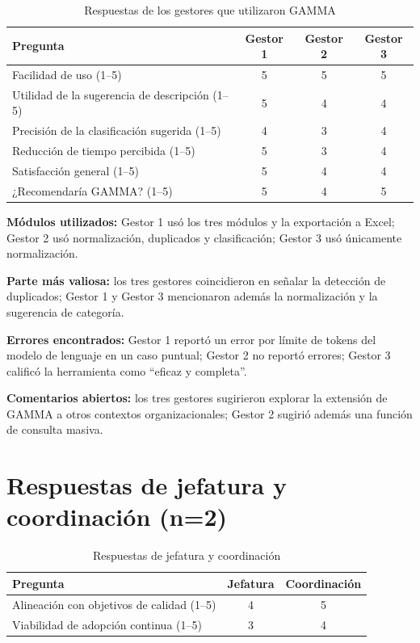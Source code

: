 \begin{table}[!htb]
\centering
\small
\caption{Respuestas de los gestores que utilizaron GAMMA}
\label{tab:encuesta-gestores}
\begin{tabular}{p{5.5cm}ccc}
\toprule
\textbf{Pregunta} & \textbf{Gestor 1} & \textbf{Gestor 2} & \textbf{Gestor 3} \\
\midrule
Facilidad de uso (1--5) & 5 & 5 & 5 \\
Utilidad de la sugerencia de descripción (1--5) & 5 & 4 & 4 \\
Precisión de la clasificación sugerida (1--5) & 4 & 3 & 4 \\
Reducción de tiempo percibida (1--5) & 5 & 3 & 4 \\
Satisfacción general (1--5) & 5 & 4 & 4 \\
¿Recomendaría GAMMA? (1--5) & 5 & 4 & 5 \\
\bottomrule
\end{tabular}
\end{table}

\textbf{Módulos utilizados:} Gestor 1 usó los tres módulos y la exportación a Excel; Gestor 2 usó normalización, duplicados y clasificación; Gestor 3 usó únicamente normalización.

\textbf{Parte más valiosa:} los tres gestores coincidieron en señalar la detección de duplicados; Gestor 1 y Gestor 3 mencionaron además la normalización y la sugerencia de categoría.

\textbf{Errores encontrados:} Gestor 1 reportó un error por límite de tokens del modelo de lenguaje en un caso puntual; Gestor 2 no reportó errores; Gestor 3 calificó la herramienta como ``eficaz y completa''.

\textbf{Comentarios abiertos:} los tres gestores sugirieron explorar la extensión de GAMMA a otros contextos organizacionales; Gestor 2 sugirió además una función de consulta masiva.

\section*{Respuestas de jefatura y coordinación (n=2)}

\begin{table}[!htb]
\centering
\small
\caption{Respuestas de jefatura y coordinación}
\label{tab:encuesta-jefatura}
\begin{tabular}{p{6.5cm}cc}
\toprule
\textbf{Pregunta} & \textbf{Jefatura} & \textbf{Coordinación} \\
\midrule
Alineación con objetivos de calidad (1--5) & 4 & 5 \\
Viabilidad de adopción continua (1--5) & 3 & 4 \\
\bottomrule
\end{tabular}
\end{table}

